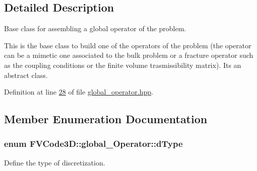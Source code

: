 \subsection{Detailed Description}
Base class for assembling a global operator of the problem. 

This is the base class to build one of the operators of the problem (the operator can be a mimetic one associated to the bulk problem or a fracture operator such as the coupling conditions or the finite volume trasmissibility matrix). It\textquotesingle{}s an abstract class. 

Definition at line \hyperlink{global__operator_8hpp_source_l00028}{28} of file \hyperlink{global__operator_8hpp_source}{global\+\_\+operator.\+hpp}.



\subsection{Member Enumeration Documentation}
\subsubsection[{\texorpdfstring{d\+Type}{dType}}]{\setlength{\rightskip}{0pt plus 5cm}enum {\bf F\+V\+Code3\+D\+::global\+\_\+\+Operator\+::d\+Type}}\hypertarget{classFVCode3D_1_1global__Operator_a9e94fbe56b84ba80f9e9be56c808e5c3}{}\label{classFVCode3D_1_1global__Operator_a9e94fbe56b84ba80f9e9be56c808e5c3}


Define the type of discretization. 

